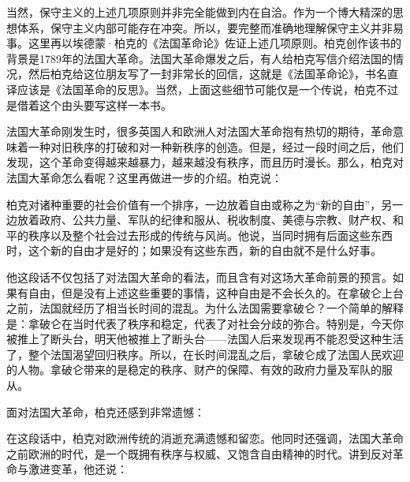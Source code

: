 当然，保守主义的上述几项原则并非完全能做到内在自洽。作为一个博大精深的思想体系，保守主义内部可能存在冲突。所以，要完整而准确地理解保守主义并非易事。这里再以埃德蒙·柏克的《法国革命论》佐证上述几项原则。柏克创作该书的背景是1789年的法国大革命。法国大革命爆发之后，有人给柏克写信介绍法国的情况，然后柏克给这位朋友写了一封非常长的回信，这就是《法国革命论》，书名直译应该是《法国革命的反思》。当然，上面这些细节可能仅是一个传说，柏克不过是借着这个由头要写这样一本书。

法国大革命刚发生时，很多英国人和欧洲人对法国大革命抱有热切的期待，革命意味着一种对旧秩序的打破和对一种新秩序的创造。但是，经过一段时间之后，他们发现，这个革命变得越来越暴力，越来越没有秩序，而且历时漫长。那么，柏克对法国大革命怎么看呢？这里再做进一步的介绍。柏克说：


柏克对诸种重要的社会价值有一个排序，一边放着自由或称之为“新的自由”，另一边放着政府、公共力量、军队的纪律和服从、税收制度、美德与宗教、财产权、和平的秩序以及整个社会过去形成的传统与风尚。他说，当同时拥有后面这些东西时，这个新的自由才是好的；如果没有这些东西，新的自由就不是什么好事。

他这段话不仅包括了对法国大革命的看法，而且含有对这场大革命前景的预言。如果有自由，但是没有上述这些重要的事情，这种自由是不会长久的。在拿破仑上台之前，法国就经历了相当长时间的混乱。为什么法国需要拿破仑？一个简单的解释是：拿破仑在当时代表了秩序和稳定，代表了对社会分歧的弥合。特别是，今天你被推上了断头台，明天他被推上了断头台——法国人后来发现再不能忍受这种生活了，整个法国渴望回归秩序。所以，在长时间混乱之后，拿破仑成了法国人民欢迎的人物。拿破仑带来的是稳定的秩序、财产的保障、有效的政府力量及军队的服从。

面对法国大革命，柏克还感到非常遗憾：


在这段话中，柏克对欧洲传统的消逝充满遗憾和留恋。他同时还强调，法国大革命之前欧洲的时代，是一个既拥有秩序与权威、又饱含自由精神的时代。讲到反对革命与激进变革，他还说：

